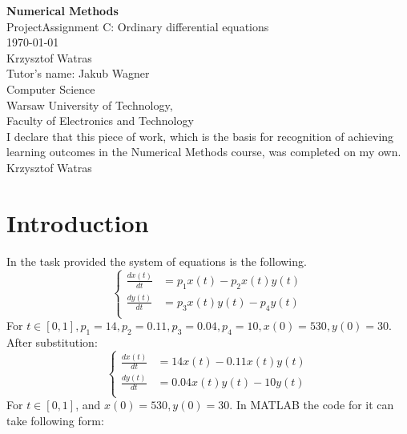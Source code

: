\documentclass[11pt]{article}
\begin{document}
\begin{titlepage}
   \begin{center}
       \vspace*{1cm}
       \textbf{\Huge Numerical Methods} \\
       \vspace{2.0cm}
       \huge{ProjectAssignment C: Ordinary differential equations} \\
       \vspace{.7cm}
       \huge{\today} \\
       \vspace{3.0cm}
       \vspace{0.4cm}
       Krzysztof Watras\\
       \vspace{ 0.2cm }
       \small{ Tutor's name: Jakub Wagner } \\
       \vspace{2 cm}   
       \small{Computer Science} \\  
       \vspace{0.2cm}       
       \small{Warsaw University of Technology,\\
       Faculty of Electronics and Technology} \\
       \vspace{2cm}
       \small{I declare that this piece of work, which is the basis for
       recognition of achieving learning outcomes in the Numerical Methods
       course, was completed on my own. Krzysztof Watras} \\
   \end{center}
\end{titlepage} 
\tableofcontents

\newpage
\section{Introduction}
In the task provided the system of equations is the following. 
\begin{equation}
    \begin{cases}
        \displaystyle\frac{dx(t)}{dt} &= p_1x(t) - p_2x(t)y(t) \\
        \displaystyle\frac{dy(t)}{dt} &= p_3x(t)y(t) - p_4y(t) \\
    \end{cases}
\end{equation}
For $t\in[0,1],p_1=14,p_2=0.11,p_3=0.04,p_4=10,x(0)=530,y(0)=30$.\\
After substitution:
\begin{equation}
    \begin{cases}
        \displaystyle\frac{dx(t)}{dt} &= 14 x(t) - 0.11 x(t)y(t) \\
        \displaystyle\frac{dy(t)}{dt} &= 0.04 x(t)y(t) - 10 y(t) \\
    \end{cases}
\end{equation}
For $t\in [0,1]$, and $x(0) = 530, y(0) = 30$.
In MATLAB the code for it can take following form:

\end{document}
